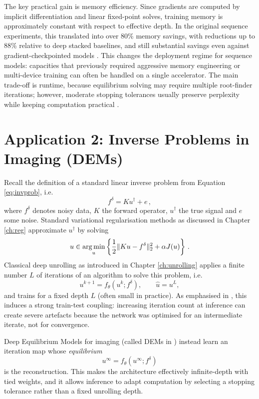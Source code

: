 The key practical gain is memory efficiency. Since gradients are computed by implicit differentiation and linear fixed-point solves, training memory is approximately constant with respect to effective depth. In the original sequence experiments, this translated into over 80\% memory savings, with reductions up to 88\% relative to deep stacked baselines, and still substantial savings even against gradient-checkpointed models \cite{bai2019deep}. This changes the deployment regime for sequence models: capacities that previously required aggressive memory engineering or multi-device training can often be handled on a single accelerator. The main trade-off is runtime, because equilibrium solving may require multiple root-finder iterations; however, moderate stopping tolerances usually preserve perplexity while keeping computation practical \cite{bai2019deep}.

\section{Application 2: Inverse Problems in Imaging (DEMs)}\label{sec:dem}

Recall the definition of a standard linear inverse problem from Equation \eqref{eq:invprob}, i.e.
\begin{equation*}
    f^\delta = K u^\dagger + e \, ,
\end{equation*}
where $f^\delta$ denotes noisy data, $K$ the forward operator, $u^\dagger$ the true signal and $e$ some noise. Standard variational regularisation methods as discussed in Chapter \ref{ch:reg} approximate $u^\dagger$ by solving
\begin{equation*}
    u \in \operatorname*{arg\,min}_u \left\{ \frac{1}{2}\|Ku-f^\delta\|_2^2 + \alpha J(u) \right\} \, .
\end{equation*}
Classical deep unrolling as introduced in Chapter \ref{ch:unrolling} applies a finite number $L$ of iterations of an algorithm to solve this problem, i.e.
\begin{equation*}
    u^{k+1} = f_\theta(u^k;f^\delta), \qquad \hat u = u^L,
\end{equation*}
and trains for a fixed depth $L$ (often small in practice). As emphasised in \cite{gilton2021deep}, this induces a strong train-test coupling: increasing iteration count at inference can create severe artefacts because the network was optimised for an intermediate iterate, not for convergence.

Deep Equilibrium Models for imaging (called DEMs in \cite{gilton2021deep}) instead learn an iteration map whose \emph{equilibrium}
\begin{equation*}
    u^\infty = f_\theta(u^\infty;f^\delta)
\end{equation*}
is the reconstruction. This makes the architecture effectively infinite-depth with tied weights, and it allows inference to adapt computation by selecting a stopping tolerance rather than a fixed unrolling depth.

